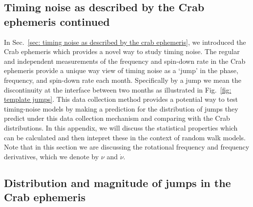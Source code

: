\documentclass[../full_thesis/full_thesis.tex]{subfiles}
\begin{document}
\begin{subappendices}
\section{Timing noise as described by the Crab ephemeris continued}
\label{sec: crab ephem cont}

In Sec.~\ref{sec: timing noise as described by the crab ephemeris}, we
introduced the Crab ephemeris which provides a novel way to study timing noise.
The regular and independent measurements of the frequency and spin-down rate in
the Crab ephemeris provide a unique way view of timing noise as a `jump' in the
phase, frequency, and spin-down rate each month. Specifically by a jump we mean
the discontinuity at the interface between two months as illustrated in
Fig.~\ref{fig: template jumps}.  This data collection method provides a
potential way to test timing-noise models by making a prediction for the
distribution of jumps they predict under this data collection mechanism and
comparing with the Crab distributions.  In this appendix, we will discuss the
statistical properties which can be calculated and then intepret these in the
context of random walk models. Note that in this section we are discussing the
rotational frequency and frequency derivatives, which we denote by $\nu$ and
$\dot{\nu}$.

\subsection{Distribution and magnitude of jumps in the Crab ephemeris}
\label{sec: jumps}


\end{subappendices}
\end{document}
